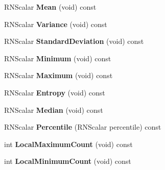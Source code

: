 \begin{DoxyCompactItemize}
\item 
R\+N\+Scalar {\bfseries Mean} (void) const \hypertarget{struct_r3_mesh_property_ab8e2d075f0a840a7e5fa5ef393c3c0ea}{}\label{struct_r3_mesh_property_ab8e2d075f0a840a7e5fa5ef393c3c0ea}

\item 
R\+N\+Scalar {\bfseries Variance} (void) const \hypertarget{struct_r3_mesh_property_aa352fb39858f783f893c28d93d0df87b}{}\label{struct_r3_mesh_property_aa352fb39858f783f893c28d93d0df87b}

\item 
R\+N\+Scalar {\bfseries Standard\+Deviation} (void) const \hypertarget{struct_r3_mesh_property_a94023ff1ce1fadc99d99b05742c064b5}{}\label{struct_r3_mesh_property_a94023ff1ce1fadc99d99b05742c064b5}

\item 
R\+N\+Scalar {\bfseries Minimum} (void) const \hypertarget{struct_r3_mesh_property_a03cd068086f1dd0f5b70e945b9e26540}{}\label{struct_r3_mesh_property_a03cd068086f1dd0f5b70e945b9e26540}

\item 
R\+N\+Scalar {\bfseries Maximum} (void) const \hypertarget{struct_r3_mesh_property_ac1329d253d162ead492c82c57ed42803}{}\label{struct_r3_mesh_property_ac1329d253d162ead492c82c57ed42803}

\item 
R\+N\+Scalar {\bfseries Entropy} (void) const \hypertarget{struct_r3_mesh_property_ad1f8916c6480c2de0f20e54a50206cc7}{}\label{struct_r3_mesh_property_ad1f8916c6480c2de0f20e54a50206cc7}

\item 
R\+N\+Scalar {\bfseries Median} (void) const \hypertarget{struct_r3_mesh_property_a66c729c95a14d850fe3041920d0c7d12}{}\label{struct_r3_mesh_property_a66c729c95a14d850fe3041920d0c7d12}

\item 
R\+N\+Scalar {\bfseries Percentile} (R\+N\+Scalar percentile) const \hypertarget{struct_r3_mesh_property_aaf231a0fce7d871eb0a4b9768429dc6d}{}\label{struct_r3_mesh_property_aaf231a0fce7d871eb0a4b9768429dc6d}

\item 
int {\bfseries Local\+Maximum\+Count} (void) const \hypertarget{struct_r3_mesh_property_a358a9708419bf9c8626cedb94a987aef}{}\label{struct_r3_mesh_property_a358a9708419bf9c8626cedb94a987aef}

\item 
int {\bfseries Local\+Minimum\+Count} (void) const \hypertarget{struct_r3_mesh_property_af762765de47aea8046b49337a2cee0cb}{}\label{struct_r3_mesh_property_af762765de47aea8046b49337a2cee0cb}


\end{DoxyCompactItemize}
